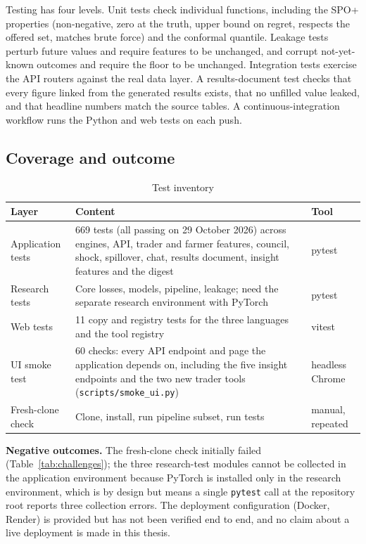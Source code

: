 Testing has four levels. Unit tests check individual functions, including the SPO+ properties (non-negative, zero at the truth, upper bound on regret, respects the offered set, matches brute force) and the conformal quantile. Leakage tests perturb future values and require features to be unchanged, and corrupt not-yet-known outcomes and require the floor to be unchanged. Integration tests exercise the API routers against the real data layer. A results-document test checks that every figure linked from the generated results exists, that no unfilled value leaked, and that headline numbers match the source tables. A continuous-integration workflow runs the Python and web tests on each push.

\subsection{Coverage and outcome}

\begin{table}[!t]
\centering
\caption{Test inventory}
\label{tab:tests}
\small
\begin{tabular}{|l|p{6.4cm}|l|}
\hline
\textbf{Layer} & \textbf{Content} & \textbf{Tool} \\ \hline
Application tests & 669 tests (all passing on 29 October 2026) across engines, API, trader and farmer features, council, shock, spillover, chat, results document, insight features and the digest & pytest \\ \hline
Research tests & Core losses, models, pipeline, leakage; need the separate research environment with PyTorch & pytest \\ \hline
Web tests & 11 copy and registry tests for the three languages and the tool registry & vitest \\ \hline
UI smoke test & 60 checks: every API endpoint and page the application depends on, including the five insight endpoints and the two new trader tools (\texttt{scripts/smoke\_ui.py}) & headless Chrome \\ \hline
Fresh-clone check & Clone, install, run pipeline subset, run tests & manual, repeated \\ \hline
\end{tabular}
\end{table}

\noindent\textbf{Negative outcomes.} The fresh-clone check initially failed (Table~\ref{tab:challenges}); the three research-test modules cannot be collected in the application environment because PyTorch is installed only in the research environment, which is by design but means a single \texttt{pytest} call at the repository root reports three collection errors. The deployment configuration (Docker, Render) is provided but has not been verified end to end, and no claim about a live deployment is made in this thesis.

